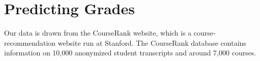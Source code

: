 \documentclass{article} %
\begin{document}


\section{Predicting Grades}
Our data is drawn from the CourseRank website, which is a course-recommendation website run at Stanford. The CourseRank database contains information on 10,000 anonymized student transcripts and around 7,000 courses.







%


\end{document}
